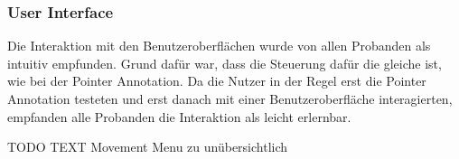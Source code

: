 \subsubsection{User Interface}
Die Interaktion mit den Benutzeroberflächen wurde von allen Probanden als intuitiv empfunden. Grund dafür war, dass die Steuerung dafür die gleiche ist, wie bei der Pointer Annotation. Da die Nutzer in der Regel erst die Pointer Annotation testeten und erst danach mit einer Benutzeroberfläche interagierten, empfanden alle Probanden die Interaktion als leicht erlernbar. 

TODO TEXT Movement Menu zu unübersichtlich





